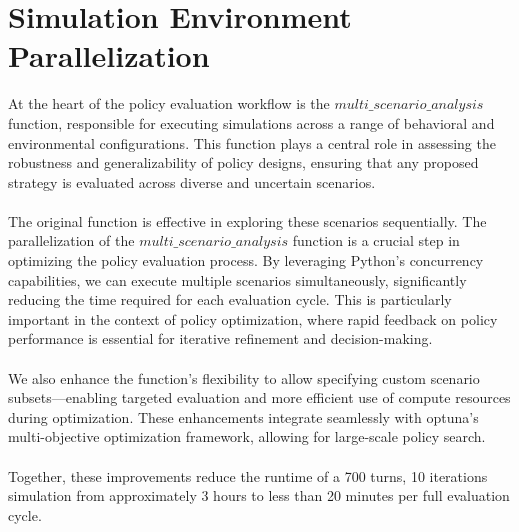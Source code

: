 \documentclass[a4paper, 12pt]{article}
\begin{document}
\section{Simulation Environment Parallelization}
At the heart of the policy evaluation workflow is the $multi\_scenario\_analysis$ function, responsible 
for executing simulations across a range of behavioral and environmental configurations. This function 
plays a central role in assessing the robustness and generalizability of policy designs, ensuring that 
any proposed strategy is evaluated across diverse and uncertain scenarios. 
\\ \\
The original function is effective in exploring these scenarios sequentially. The parallelization of the 
$multi\_scenario\_analysis$ function is a crucial step in optimizing the policy evaluation process. 
By leveraging Python's concurrency capabilities, we can execute multiple scenarios simultaneously, 
significantly reducing the time required for each evaluation cycle. This is particularly important in the 
context of policy optimization, where rapid feedback on policy performance is essential for iterative 
refinement and decision-making.
\\ \\
We also enhance the function's flexibility to allow specifying custom scenario subsets—enabling 
targeted evaluation and more efficient use of compute resources during optimization. These enhancements 
integrate seamlessly with optuna’s multi-objective optimization framework, allowing for large-scale policy search.
\\ \\
Together, these improvements reduce the runtime of a 700 turns, 10 iterations simulation from approximately 
3 hours to less than 20 minutes per full evaluation cycle.
\end{document}
